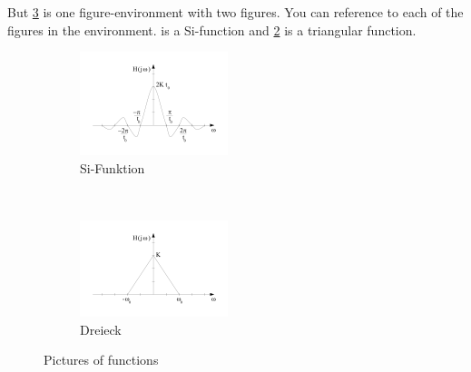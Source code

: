 But \cref{fig:functions} is one figure-environment with two figures. You can reference to each of the figures in the environment.  is a Si-function and \cref{fig:dreieck} is a triangular function.

\begin{figure}[htb]
	\centering
	\begin{subfigure}[b]{0.4\textwidth}
		\includegraphics[width=\textwidth]{figures/Si-function.png}
		\caption{Si-Funktion}
		\label{fig:si-function}
	\end{subfigure}
	~ %
	\begin{subfigure}[b]{0.4\textwidth}
		\includegraphics[width=\textwidth]{figures/dreieck.png}
		\caption{Dreieck}
		\label{fig:dreieck}
	\end{subfigure}
	\caption{Pictures of functions}
	\label{fig:functions}
\end{figure}

